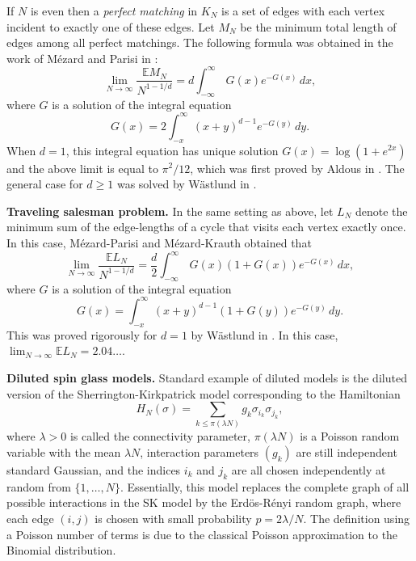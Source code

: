\documentclass[12pt]{article}
\newcommand{\e}{\mathbb{E}}
\theoremstyle{nonumberplain}
\begin{document}
If $N$ is even then a \emph{perfect matching} in $K_N$ is a set of edges with each vertex incident to exactly one of these edges. Let $M_N$ be the minimum total length of edges among all perfect matchings. The following formula was obtained in the work of M\'ezard and Parisi in \cite{MP1, MP3, MP4}:
$$
\lim_{N\to\infty}\frac{\e M_N}{N^{1-1/d}} = d \int_{-\infty}^\infty \, G(x)e^{-G(x)} \,dx,
$$
where $G$ is a solution of the integral equation
$$
G(x) = 2 \int_{-x}^\infty (x+y)^{d-1} e^{-G(y)}\, dy.
$$
When $d=1$, this integral equation has unique solution $G(x) = \log(1+e^{2x})$ and the above limit is equal to $\pi^2/12$, which was first proved by Aldous in \cite{Aldous}. The general case for $d\geq 1$ was solved by W\"astlund in \cite{Wastlund2}. 

\medskip
\noindent
\textbf{Traveling salesman problem.} In the same setting as above, let $L_N$ denote the minimum sum of the edge-lengths of a cycle that visits each vertex exactly once. In this case, M\'ezard-Parisi \cite{MP2, MP3} and M\'ezard-Krauth \cite{KM} obtained that
$$
\lim_{N\to\infty}\frac{\e L_N}{N^{1-1/d}} = \frac{d}{2} \int_{-\infty}^\infty \, G(x)(1+G(x))e^{-G(x)} \,dx,
$$
where $G$ is a solution of the integral equation
$$
G(x) = \int_{-x}^\infty (x+y)^{d-1} (1+G(y))e^{-G(y)}\, dy.
$$
This was proved rigorously for $d= 1$ by W\"astlund in \cite{Wastlund1}. In this case, $\lim_{N\to\infty}\e L_N = 2.04\ldots.$

\medskip
\noindent
\textbf{Diluted spin glass models.} Standard example of diluted models is the diluted version of the Sherrington-Kirkpatrick model corresponding to the Hamiltonian
\begin{equation}
H_N(\sigma) = \sum_{k\leq \pi(\lambda N)} g_k \sigma_{i_k} \sigma_{j_k},
\label{SKdiluted}
\end{equation}
where $\lambda>0$ is called the connectivity parameter, $\pi(\lambda N)$ is a Poisson random variable with the mean $\lambda N$, interaction parameters $(g_k)$ are still independent standard Gaussian, and the indices $i_k$ and $j_k$ are all chosen independently at random from $\{1,\ldots,N\}$. Essentially, this model replaces the complete graph of all possible interactions in the SK model  by the Erd\"os-R\'enyi random graph, where each edge $(i,j)$ is chosen with small probability $p=2\lambda/N.$ The definition using a Poisson number of terms is due to the classical Poisson approximation to the Binomial distribution. 
\end{document}
